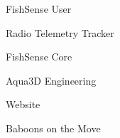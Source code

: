 \item FishSense User
\item Radio Telemetry Tracker
\item FishSense Core
\item Aqua3D Engineering
\item Website
\item Baboons on the Move
